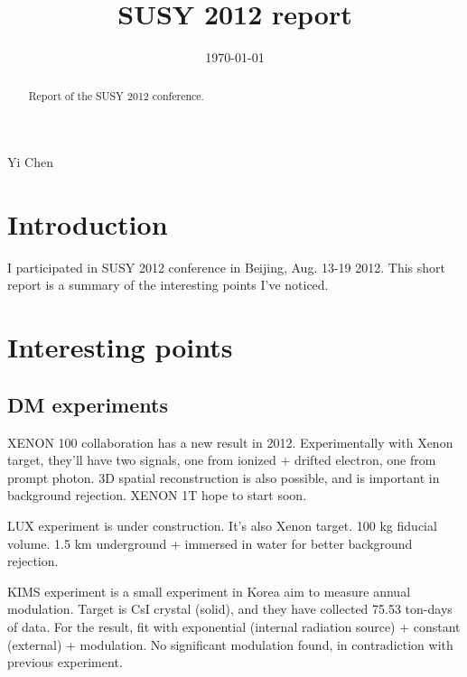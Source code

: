 \documentclass{fheadnote}
\begin{document}
\begin{titlepage}

   \date{\today}

   \title{SUSY 2012 report}

   \begin{Authlist}
      Yi Chen
   \end{Authlist}


   \begin{abstract}
      Report of the SUSY 2012 conference.
   \end{abstract}

\end{titlepage}

\setcounter{page}{2}

\section{Introduction}

I participated in SUSY 2012 conference in Beijing, Aug. 13-19 2012.
This short report is a summary of the interesting points I've noticed.

\section{Interesting points}

\subsection{DM experiments}

XENON 100 collaboration has a new result in 2012.
Experimentally with Xenon target, they'll have two signals, one from ionized + drifted electron,
one from prompt photon.
3D spatial reconstruction is also possible, and is important in background rejection.
XENON 1T hope to start soon.

LUX experiment is under construction.  It's also Xenon target.  100 kg fiducial volume.
1.5 km underground + immersed in water for better background rejection.

KIMS experiment is a small experiment in Korea aim to measure annual modulation.
Target is CsI crystal (solid), and they have collected 75.53 ton-days of data.
For the result, fit with exponential (internal radiation source) + constant (external) + modulation.
No significant modulation found, in contradiction with previous experiment.
\end{document}
